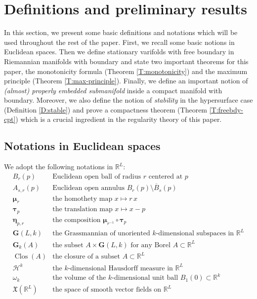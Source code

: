 \documentclass[10pt]{amsart}
\theoremstyle{definition}
\theoremstyle{remark}
\numberwithin{equation}{section}
\newcommand{\R}{\mathbb{R}}
\newcommand{\Gr}{\mathbf{G}}
\newcommand{\bmu}{\boldsymbol \mu}
\newcommand{\btau}{\boldsymbol \tau}
\newcommand{\bleta}{\boldsymbol \eta}
\newcommand{\Clos}{\operatorname{Clos}}
\begin{document}
\section{Definitions and preliminary results}
\label{S:background}

In this section, we present some basic definitions and notations which will be used throughout the rest of the paper. First, we recall some basic notions in Euclidean spaces. Then we define stationary varifolds with free boundary in Riemannian manifolds with boundary and state two important theorems for this paper, the monotonicity formula (Theorem \ref{T:monotonicity}) and the maximum principle (Theorem \ref{T:max-principle}). 
Finally, we define an important notion of \emph{(almost) properly embedded submanifold} inside a compact manifold with boundary. Moreover, we also define the notion of \emph{stability} in the hypersurface case (Definition \ref{D:stable}) and prove a compactness theorem (Theorem \ref{T:freebdy-cpt}) which is a crucial ingredient in the regularity theory of this paper.

\subsection{Notations in Euclidean spaces}
\label{SS:notation}

We adopt the following notations in $\R^L$:
\[ \begin{array}{cl}
B_r(p) & \text{Euclidean open ball of radius $r$ centered at $p$} \\
A_{s,r}(p) & \text{Euclidean open annulus } B_r(p) \setminus \overline{B}_s(p) \\
\bmu_r & \text{the homothety map } x \mapsto r \, x \\
\btau_p & \text{the translation map } x \mapsto x-p \\
\bleta_{p,r} & \text{the composition } \bmu_{r^{-1}} \circ \btau_p \\
\Gr(L,k) & \text{the Grassmannian of unoriented $k$-dimensional subspaces in } \mathbb{R}^L \\
\Gr_k(A) & \text{the subset } A \times \Gr(L,k) \text{ for any Borel }A \subset \mathbb{R}^L\\
\Clos(A) & \text{the closure of a subset }A \subset \mathbb{R}^L\\
\mathcal{H}^k & \text{the $k$-dimensional Hausdorff measure in } \mathbb{R}^L\\
\omega_k & \text{the volume of the $k$-dimensional unit ball } B_1(0) \subset \R^k\\
\mathfrak{X}(\mathbb{R}^L) & \text{the space of smooth vector fields on $\mathbb{R}^L$}
\end{array} \]
\end{document}
